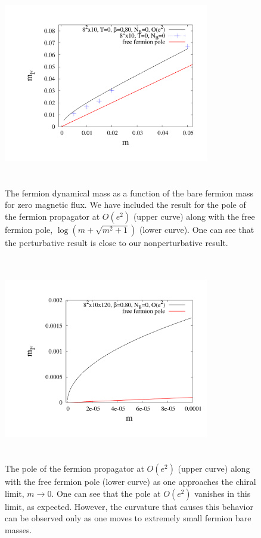 \documentclass[aps,prd,twocolumn,showpacs,superscriptaddress,groupedaddress]{revtex4}  %
\begin{document}
\begin{figure}
\vspace{-1.2cm}
  \includegraphics[height=9cm,width=9cm]{ferm_pole_vs_m.pdf} 
  \vspace{-1.25cm}
\caption{The fermion dynamical mass as a function of the bare fermion mass for zero magnetic flux. We have included the result for the pole of the fermion propagator at $O(e^2)$ (upper curve) along with the free fermion pole, $\log\left(m+\sqrt{m^2+1}\right)$ (lower curve). One can see that the perturbative result is close to our nonperturbative result.}
\label{MFvsmZeroB}
\end{figure}

\begin{figure}
\vspace{-1.2cm}
  \includegraphics[height=9cm,width=9cm]{ferm_pole_vs_m_zoom.pdf} 
  \vspace{-1.25cm}
\caption{The pole of the fermion propagator at $O(e^2)$ (upper curve) along with the free fermion pole (lower curve) as one approaches the chiral limit, $m \to 0$. One can see that the pole at $O(e^2)$ vanishes in this limit, as expected. However, the curvature that causes this behavior can be observed only as one moves to extremely small fermion bare masses.}
\label{MFvsmZeroBZoom}
\end{figure}
\end{document}
